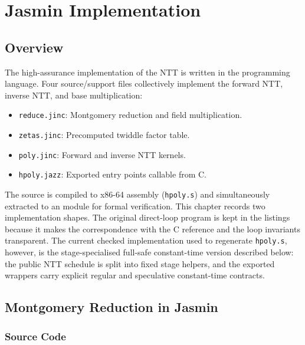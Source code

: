 
\chapter{Jasmin Implementation}
\label{ch:jasmin_impl}

\section{Overview}

The high-assurance implementation of the \haetae{} NTT is written in the
\jasmin{} programming language.  Four source/support files collectively
implement the forward NTT, inverse NTT, and base multiplication:

\begin{itemize}
  \item \texttt{reduce.jinc}: Montgomery reduction and field multiplication.
  \item \texttt{zetas.jinc}: Precomputed twiddle factor table.
  \item \texttt{poly.jinc}: Forward and inverse NTT kernels.
  \item \texttt{hpoly.jazz}: Exported entry points callable from C.
\end{itemize}

The \jasmin{} source is compiled to x86-64 assembly (\texttt{hpoly.s}) and
simultaneously extracted to an \easycrypt{} module for formal verification.
This chapter records two implementation shapes.  The original direct-loop
program is kept in the listings because it makes the correspondence with the
C reference and the \easycrypt{} loop invariants transparent.  The current
checked implementation used to regenerate \texttt{hpoly.s}, however, is the
stage-specialised full-safe constant-time version described below: the public
NTT schedule is split into fixed stage helpers, and the exported wrappers carry
explicit regular and speculative constant-time contracts.

\section{Montgomery Reduction in Jasmin}

\subsection{Source Code}

